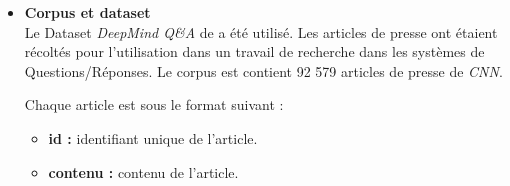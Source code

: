     \begin{itemize}[label={}, leftmargin=*]
        \item{\textbf{Corpus et dataset}}\\
        Le Dataset \emph{DeepMind Q\&A} de \cite{cnndailymail} a été utilisé. Les articles de presse ont étaient récoltés pour l'utilisation dans un travail de recherche dans les systèmes de Questions/Réponses. Le corpus est contient 92 579 articles de presse de \emph{CNN}.

        Chaque article est sous le format suivant :
       \begin{itemize}
        \item \textbf{id : }identifiant unique de l'article.
        \item \textbf{contenu : }contenu de l'article.
       \end{itemize}
    \end{itemize}
        
